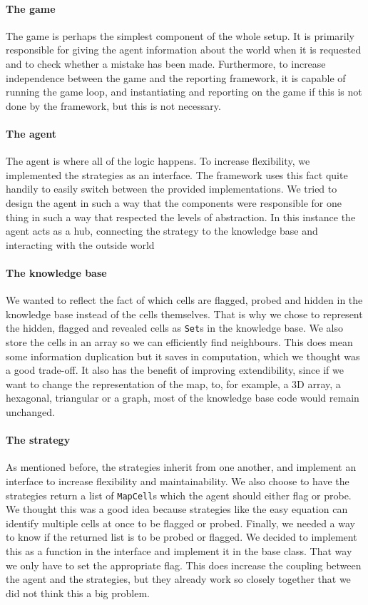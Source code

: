 \documentclass[british]{article}
\newcommand{\code}[1]{\texttt{#1}}
\begin{document}
\paragraph{The game} The game is perhaps the simplest component of the whole setup. It is primarily responsible for giving the agent information about the world when it is requested and to check whether a mistake has been made. Furthermore, to increase independence between the game and the reporting framework, it is capable of running the game loop, and instantiating and reporting on the game if this is not done by the framework, but this is not necessary.

\paragraph{The agent} The agent is where all of the logic happens. To increase flexibility, we implemented the strategies as an interface. The framework uses this fact quite handily to easily switch between the provided implementations. We tried to design the agent in such a way that the components were responsible for one thing in such a way that respected the levels of abstraction. In this instance the agent acts as a hub, connecting the strategy to the knowledge base and interacting with the outside world 

\paragraph{The knowledge base} We wanted to reflect the fact of which cells are flagged, probed and hidden in the knowledge base instead of the cells themselves. That is why we chose to represent the hidden, flagged and revealed cells as \code{Set}s in the knowledge base. We also store the cells in an array so we can efficiently find neighbours. This does mean some information duplication but it saves in computation, which we thought was a good trade-off. It also has the benefit of improving extendibility, since if we want to change the representation of the map, to, for example, a 3D array, a hexagonal, triangular or a graph, most of the knowledge base code would remain unchanged. 

\paragraph{The strategy} As mentioned before, the strategies inherit from one another, and implement an interface to increase flexibility and maintainability. We also choose to have the strategies return a list of \code{MapCell}s which the agent should either flag or probe. We thought this was a good idea because strategies like the easy equation can identify multiple cells at once to be flagged or probed. Finally, we needed a way to know if the returned list is to be probed or flagged. We decided to implement this as a function in the interface and implement it in the base class. That way we only have to set the appropriate flag. This does increase the coupling between the agent and the strategies, but they already work so closely together that we did not think this a big problem.
\end{document}
